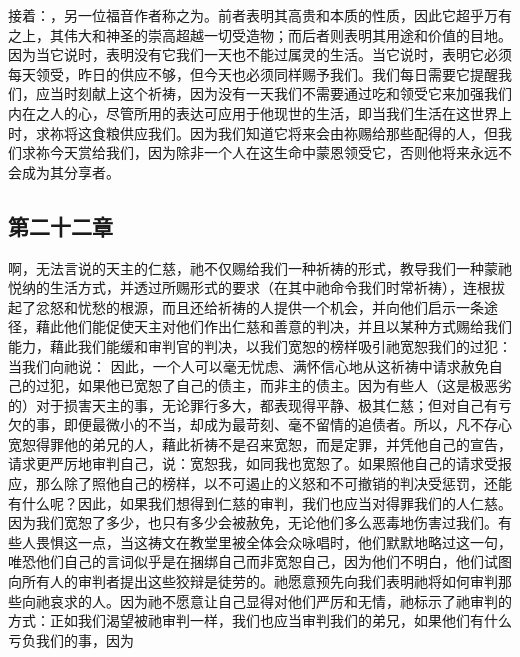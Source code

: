 接着：，另一位福音作者称之为。前者表明其高贵和本质的性质，因此它超乎万有之上，其伟大和神圣的崇高超越一切受造物；而后者则表明其用途和价值的目地。因为当它说时，表明没有它我们一天也不能过属灵的生活。当它说时，表明它必须每天领受，昨日的供应不够，但今天也必须同样赐予我们。我们每日需要它提醒我们，应当时刻献上这个祈祷，因为没有一天我们不需要通过吃和领受它来加强我们内在之人的心，尽管所用的表达可应用于他现世的生活，即当我们生活在这世界上时，求祢将这食粮供应我们。因为我们知道它将来会由祢赐给那些配得的人，但我们求祢今天赏给我们，因为除非一个人在这生命中蒙恩领受它，否则他将来永远不会成为其分享者。\par


\subsection{第二十二章}

\par

 啊，无法言说的天主的仁慈，祂不仅赐给我们一种祈祷的形式，教导我们一种蒙祂悦纳的生活方式，并透过所赐形式的要求（在其中祂命令我们时常祈祷），连根拔起了忿怒和忧愁的根源，而且还给祈祷的人提供一个机会，并向他们启示一条途径，藉此他们能促使天主对他们作出仁慈和善意的判决，并且以某种方式赐给我们能力，藉此我们能缓和审判官的判决，以我们宽恕的榜样吸引祂宽恕我们的过犯：当我们向祂说： 因此，一个人可以毫无忧虑、满怀信心地从这祈祷中请求赦免自己的过犯，如果他已宽恕了自己的债主，而非主的债主。因为有些人（这是极恶劣的）对于损害天主的事，无论罪行多大，都表现得平静、极其仁慈；但对自己有亏欠的事，即便最微小的不当，却成为最苛刻、毫不留情的追债者。所以，凡不存心宽恕得罪他的弟兄的人，藉此祈祷不是召来宽恕，而是定罪，并凭他自己的宣告，请求更严厉地审判自己，说：宽恕我，如同我也宽恕了。如果照他自己的请求受报应，那么除了照他自己的榜样，以不可遏止的义怒和不可撤销的判决受惩罚，还能有什么呢？因此，如果我们想得到仁慈的审判，我们也应当对得罪我们的人仁慈。因为我们宽恕了多少，也只有多少会被赦免，无论他们多么恶毒地伤害过我们。有些人畏惧这一点，当这祷文在教堂里被全体会众咏唱时，他们默默地略过这一句，唯恐他们自己的言词似乎是在捆绑自己而非宽恕自己，因为他们不明白，他们试图向所有人的审判者提出这些狡辩是徒劳的。祂愿意预先向我们表明祂将如何审判那些向祂哀求的人。因为祂不愿意让自己显得对他们严厉和无情，祂标示了祂审判的方式：正如我们渴望被祂审判一样，我们也应当审判我们的弟兄，如果他们有什么亏负我们的事，因为\par


